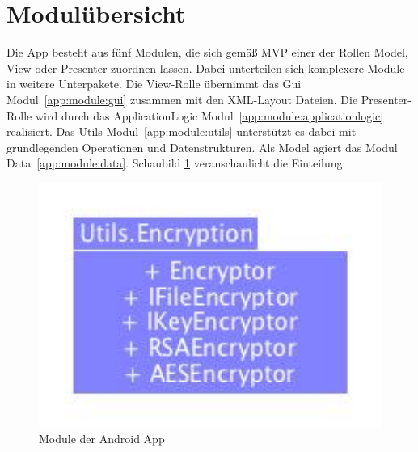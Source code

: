 \section{Modulübersicht} \label{app:modul}
Die App besteht aus fünf Modulen, die sich gemäß MVP einer der Rollen Model, View oder Presenter zuordnen lassen. Dabei unterteilen sich komplexere Module in weitere Unterpakete. Die View-Rolle übernimmt das Gui Modul~\eqref{app:module:gui} zusammen mit den XML-Layout Dateien. Die Presenter-Rolle wird durch das ApplicationLogic Modul~\eqref{app:module:applicationlogic} realisiert. Das Utils-Modul~\eqref{app:module:utils} unterstützt es dabei mit grundlegenden Operationen und Datenstrukturen. Als Model agiert das Modul Data~\eqref{app:module:data}. Schaubild \ref{fig:modules_overview} veranschaulicht die Einteilung:
\begin{figure}[ht]
	\centering
\includegraphics[width=1\textwidth]{./resources/Diagramme/App/modules_overview.jpg}
\caption{Module der Android App}
	\label{fig:modules_overview}
\end{figure}



